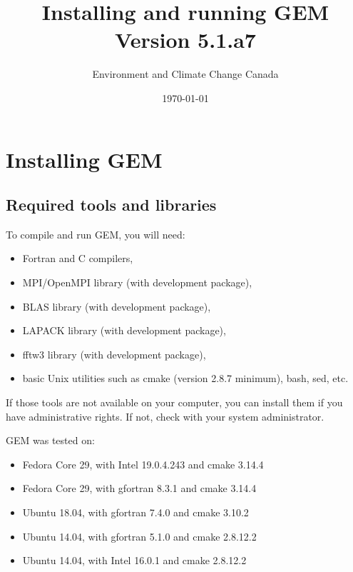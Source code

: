 \documentclass[11pt]{book}
\begin{document}

\thispagestyle{empty}

\title{Installing and running GEM \\ Version 5.1.a7}
\author{Environment and Climate Change Canada}
\date{\today}

\maketitle 


\thispagestyle{empty}\tableofcontents


\chapter{Installing GEM}

\section{Required tools and libraries}
\label{required-tools}

To compile and run GEM, you will need:

\begin{itemize}
\item Fortran and C compilers,
\item MPI/OpenMPI library (with development package),
\item BLAS library (with development package),
\item LAPACK library (with development package),
\item fftw3 library (with development package),
\item basic Unix utilities such as cmake (version 2.8.7 minimum), bash, sed, etc.
\end{itemize}

If those tools are not available on your computer, you can install them if
you have administrative rights. If not, check with your system administrator.

GEM was tested on:
\begin{itemize}
\item Fedora Core 29, with Intel 19.0.4.243 and cmake 3.14.4
\item Fedora Core 29, with gfortran 8.3.1 and cmake 3.14.4
\item Ubuntu 18.04, with gfortran 7.4.0 and cmake 3.10.2
\item Ubuntu 14.04, with gfortran 5.1.0 and cmake 2.8.12.2
\item Ubuntu 14.04, with Intel 16.0.1 and cmake 2.8.12.2
\end{itemize}
\end{document}
